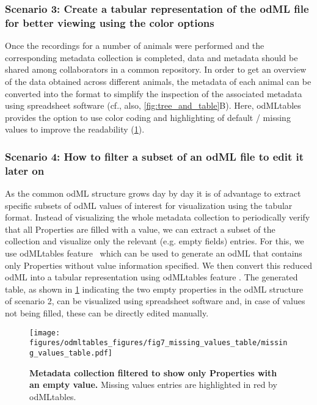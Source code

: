 \subsubsection*{Scenario 3: Create a tabular representation of the odML file for better viewing using the color options}
Once the recordings for a number of animals were performed and the corresponding metadata collection is completed, data and metadata should be shared among collaborators in a common repository. In order to get an overview of the data obtained across different animals, the metadata of each animal can be converted into the  format to simplify the inspection of the associated metadata using spreadsheet software (cf., also, \cref{fig:tree_and_table}B). Here, odMLtables provides the option to use color coding and highlighting of default / missing values to improve the readability (\cref{fig:missing_values_table}).

\subsubsection*{Scenario 4: How to filter a subset of an odML file to edit it later on}
As the common odML structure grows day by day it is of advantage to extract specific subsets of odML values of interest for visualization using the tabular format. Instead of visualizing the whole metadata collection to periodically verify that all Properties are filled with a value, we can extract a subset of the collection and visualize only the relevant (e.g. empty fields) entries. For this, we use odMLtables feature \ffilter\ which can be used to generate an odML that contains only Properties without value information specified. We then convert this reduced odML into a tabular  representation using odMLtables feature \fconvert. The generated table, as shown in \cref{fig:missing_values_table} indicating the two empty properties in the odML structure of scenario 2, can be visualized using spreadsheet software and, in case of values not being filled, these can be directly edited manually.

\begin{figure}[!ht]
\begin{center}
\texttt{[image: figures/odmltables\_figures/fig7\_missing\_values\_table/missing\_values\_table.pdf]}
\caption[Metadata collection filtered to show only Properties with an empty value]{\label{fig:missing_values_table}
\textbf{Metadata collection filtered to show only Properties with an empty value.} Missing values entries are highlighted in red by odMLtables.}
\end{center}
\end{figure}

